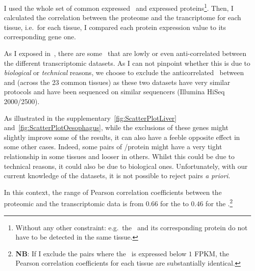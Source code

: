 I used the whole set of common expressed \mRNAs\ and
expressed proteins\footnote{Without any other constraint: e.g.\ the \mRNA\ and
its corresponding protein do not have to be detected in the same tissue.}.
Then, I calculated the correlation between the proteome and the trancriptome for
each tissue, i.e.\ for each tissue, I compared each protein expression value to
its corresponding gene one.

As I exposed in~, there are some
\mRNAs\ that are lowly or even anti-correlated between the different
transcriptomic datasets.
As I can not pinpoint whether this is due to \emph{biological} or \emph{technical}
reasons, we choose to exclude the anticorrelated \mRNAs\ between  and  (across the 23 common tissues) as these two datasets have
very similar protocols and have been sequenced on similar sequencers (Illumina
HiSeq 2000/2500).

As illustrated in the supplementary~\cref{fig:ScatterPlotLiver}
and~\cref{fig:ScatterPlotOesophagus}, while the exclusions of these genes might
slightly improve some of the results, it can also have a feeble opposite effect
in some other cases.
Indeed, some pairs of \mRNA/protein might have a very tight relationship in some
tissues and looser in others. Whilst this could be due to technical reasons, it
could also be due to biological ones. Unfortunately, with our current knowledge
of the datasets, it is not possible to reject pairs \emph{a priori}.

In this context, the range of Pearson correlation coefficients between the
proteomic and the transcriptomic data is from $0.66$ for the 
to $0.46$ for the .\footnote{\textbf{NB}: If I exclude the
pairs where the \mRNA\ is expressed below $1$ \gls{FPKM}, the Pearson correlation
coefficients for each tissue are substantially identical.}

